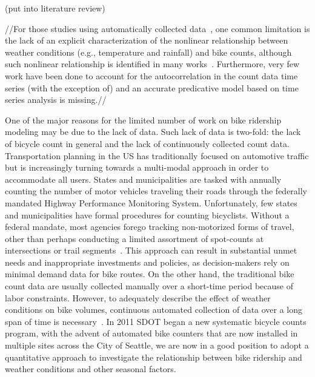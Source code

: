 \documentclass [11pt, proquest] {uwthesis}[2015/03/03]
\begin{document}
(put into literature review)

//For those studies using automatically collected data~\cite{Tin:2012aa,Nosal:2014aa}, one common limitation is the lack of an explicit characterization of the nonlinear relationship between weather conditions (e.g., temperature and rainfall) and bike counts, although such nonlinear relationship is identified in many works~\cite{Ahmed12,Miranda-Moreno:2011aa,Thomas12,Lewin:2011aa}. Furthermore, very few work have been done to account for the autocorrelation in the count data time series (with the exception of\cite{Gallop:2012aa,Nosal:2014aa}) and an accurate predicative model based on time series analysis is missing.//

One of the major reasons for the limited number of work on bike ridership modeling may be due to the lack of data. Such lack of data is two-fold: the lack of bicycle count in general and the lack of continuously collected count data. Transportation planning in the US has traditionally focused on automotive traffic but is increasingly turning towards a multi-modal approach in order to accommodate all users. States and municipalities are tasked with annually counting the number of motor vehicles traveling their roads through the federally mandated Highway Performance Monitoring System. Unfortunately, few states and municipalities have formal procedures for counting bicyclists. Without a federal mandate, most agencies forego tracking non-motorized forms of travel, other than perhaps conducting a limited assortment of spot-counts at intersections or trail segments~\cite{Kockelman16}. This approach can result in substantial unmet needs and inappropriate investments and policies, as decision-makers rely on minimal demand data for bike routes. On the other hand, the traditional bike count data are usually collected manually over a short-time period because of labor constraints. However, to adequately describe the effect of weather conditions on bike volumes, continuous automated collection of data over a long span of time is necessary~\cite{Miranda-Moreno:2011aa}. In 2011 SDOT began a new systematic bicycle counts program, with the advent of automated bike counters that are now installed in multiple sites across the City of Seattle, we are now in a good position to adopt a quantitative approach to investigate the relationship between bike ridership and weather conditions and other seasonal factors.
\end{document}
